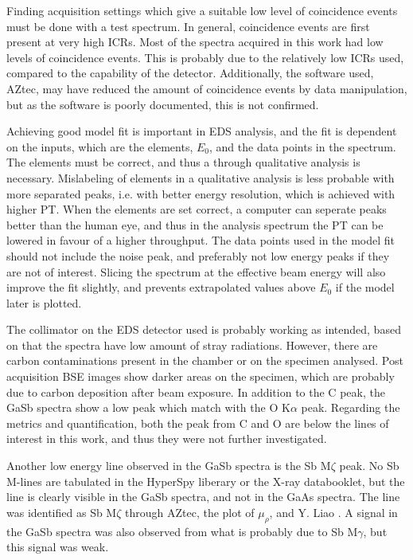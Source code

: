 Finding acquisition settings which give a suitable low level of coincidence events must be done with a test spectrum.
In general, coincidence events are first present at very high ICRs.
Most of the spectra acquired in this work had low levels of coincidence events.
This is probably due to the relatively low ICRs used, compared to the capability of the detector.
Additionally, the software used, AZtec, may have reduced the amount of coincidence events by data manipulation, but as the software is poorly documented, this is not confirmed.



Achieving good model fit is important in EDS analysis, and the fit is dependent on the inputs, which are the elements, $E_0$, and the data points in the spectrum.
The elements must be correct, and thus a through qualitative analysis is necessary.
Mislabeling of elements in a qualitative analysis is less probable with more separated peaks, i.e. with better energy resolution, which is achieved with higher PT.
When the elements are set correct, a computer can seperate peaks better than the human eye, and thus in the analysis spectrum the PT can be lowered in favour of a higher throughput.
The data points used in the model fit should not include the noise peak, and preferably not low energy peaks if they are not of interest.
Slicing the spectrum at the effective beam energy will also improve the fit slightly, and prevents extrapolated values above $E_0$ if the model later is plotted.



The collimator on the EDS detector used is probably working as intended, based on that the spectra have low amount of stray radiations.
However, there are carbon contaminations present in the chamber or on the specimen analysed.
Post acquisition BSE images show darker areas on the specimen, which are probably due to carbon deposition after beam exposure.
In addition to the C peak, the GaSb spectra show a low peak which match with the O K$\alpha$ peak.
Regarding the metrics and quantification, both the peak from C and O are below the lines of interest in this work, and thus they were not further investigated.

Another low energy line observed in the GaSb spectra is the Sb M$\zeta$ peak.
No Sb M-lines are tabulated in the HyperSpy liberary or the X-ray databooklet, but the line is clearly visible in the GaSb spectra, and not in the GaAs spectra.
The line was identified as Sb M$\zeta$ through AZtec, the plot of $\mu_\rho$, and Y. Liao \cite{liao2006practical}.
A signal in the GaSb spectra was also observed from what is probably due to Sb M$\gamma$, but this signal was weak.

